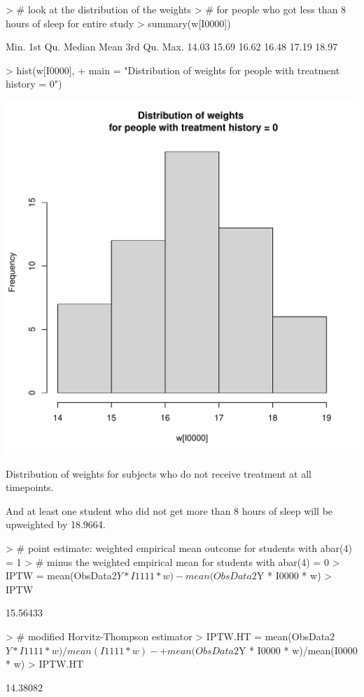 \documentclass[answers]{exam}
\newenvironment{myfigure}{\captionsetup{type=mytype}}{}
\begin{document}
\begin{enumerate}
\begin{solution}
\begin{Schunk}
\begin{Sinput}
> # look at the distribution of the weights 
> # for people who got less than 8 hours of sleep for entire study
> summary(w[I0000])
\end{Sinput}
\begin{Soutput}
   Min. 1st Qu.  Median    Mean 3rd Qu.    Max. 
  14.03   15.69   16.62   16.48   17.19   18.97 
\end{Soutput}
\begin{Sinput}
> hist(w[I0000], 
+      main = "Distribution of weights \n for people with treatment history = 0")
\end{Sinput}
\end{Schunk}
\begin{myfigure}
\begin{center}
\includegraphics[width=.4\textwidth]{w0000Hist2.pdf}
\caption{Distribution of weights for subjects who do not receive treatment at all timepoints.}
\label{Fig:w0000Hist2}
\end{center}
\end{myfigure}

And at least one student who did not get more than 8 hours of sleep will be upweighted by 18.9664.


\begin{Schunk}
\begin{Sinput}
> # point estimate: weighted empirical mean outcome for students with abar(4) = 1 
> # minus the weighted empirical mean for students with abar(4) = 0 
> IPTW = mean(ObsData2$Y * I1111 * w) - mean(ObsData2$Y * I0000 * w)
> IPTW
\end{Sinput}
\begin{Soutput}
[1] 15.56433
\end{Soutput}
\end{Schunk}


\begin{Schunk}
\begin{Sinput}
> # modified Horvitz-Thompson estimator
> IPTW.HT = mean(ObsData2$Y * I1111 * w)/mean(I1111 * w) - 
+   mean(ObsData2$Y * I0000 * w)/mean(I0000 * w)
> IPTW.HT
\end{Sinput}
\begin{Soutput}
[1] 14.38082
\end{Soutput}
\end{Schunk}


\end{solution}
\end{enumerate}
\end{document}
